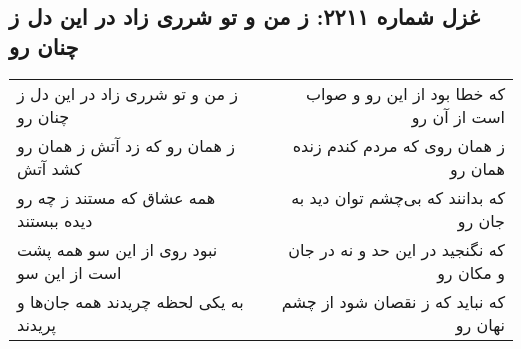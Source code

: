 \begin{center}
\section*{غزل شماره ۲۲۱۱: ز من و تو شرری زاد در این دل ز چنان رو}
\label{sec:2211}
\begin{longtable}{l p{0.5cm} r}
ز من و تو شرری زاد در این دل ز چنان رو
&&
که خطا بود از این رو و صواب است از آن رو
\\
ز همان رو که زد آتش ز همان رو کشد آتش
&&
ز همان روی که مردم کندم زنده همان رو
\\
همه عشاق که مستند ز چه رو دیده ببستند
&&
که بدانند که بی‌چشم توان دید به جان رو
\\
نبود روی از این سو همه پشت است از این سو
&&
که نگنجید در این حد و نه در جان و مکان رو
\\
به یکی لحظه چریدند همه جان‌ها و پریدند
&&
که نباید که ز نقصان شود از چشم نهان رو
\\
\end{longtable}
\end{center}
